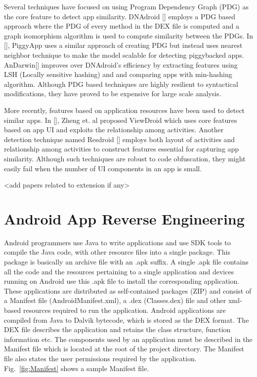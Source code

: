 Several techniques have focused on using Program Dependency Graph (PDG) as the core feature to detect app similarity. DNAdroid [] employs a PDG based approach where the PDG of every method in the DEX file is computed and a graph isomorphism algorithm is used to compute similarity between the PDGs. In [], PiggyApp uses a similar approach of creating PDG but instead uses nearest neighbor technique to make the model scalable for detecting piggybacked apps. AnDarwin[] improves over DNAdroid’s efficiency by extracting features using LSH (Locally sensitive hashing) and and comparing apps with min-hashing algorithm. Although PDG based techniques are highly resilient to syntactical modifications, they have proved to be expensive for large scale analysis.
 
More recently, features based on application resources have been used to detect similar apps. In [], Zheng et. al proposed ViewDroid which uses core features based on app UI and exploits the relationship among activities. Another detection technique named Resdroid [] employs both layout of activities and relationship among activities to construct features essential for capturing app similarity. Although such techniques are robust to code obfuscation, they might easily fail when the number of UI components in an app is small. 
 
<add papers related to extension if any>

\section{Android App Reverse Engineering}
Android programmers use Java to write applications and use SDK tools to compile the Java code, with other resource files into a single package. This package is basically an archive file with an .apk suffix. A single .apk file contains all the code and the resources pertaining to a single application and devices running on Android use this .apk file to install the corresponding application. These applications are distributed as self-contained packages (ZIP) and consist of a Manifest file (AndroidManifest.xml), a .dex (Classes.dex) file and other xml-based resources required to run the application. Android applications are compiled from Java to Dalvik bytecode, which is stored as the DEX format. The DEX file describes the application and retains the class structure, function information etc.  The components used by an application must be described in the Manifest file which is located at the root of the project directory. The Manifest file also states the user permissions required by the application. Fig.~\ref{fig:Manifest} shows a sample Manifest file.

